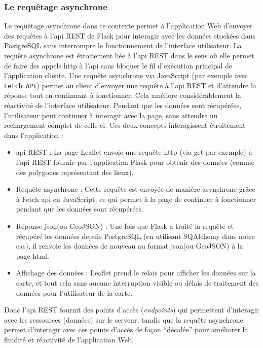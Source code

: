 \subsubsection{Le requêtage asynchrone}
Le requêtage asynchrone dans ce contexte permet à l'application Web d'envoyer des requêtes à l'\acrshort{api} REST de Flask pour interagir avec les données stockées dans PostgreSQL sans interrompre le fonctionnement de l'interface utilisateur. La requête asynchrone est étroitement liée à l'\acrshort{api} REST dans le sens où elle permet de faire des appels \acrshort{http} à l'\acrshort{api} sans bloquer le fil d'exécution principal de l'application cliente. Une requête asynchrone via JavaScript (par exemple avec \texttt{Fetch API}) permet au client d'envoyer une requête à l'\acrshort{api} REST et d’attendre la réponse tout en continuant à fonctionner. Cela améliore considérablement la réactivité de l'interface utilisateur. Pendant que les données sont récupérées, l'utilisateur peut continuer à interagir avec la page, sans attendre un rechargement complet de celle-ci. Ces deux concepts  interagissent étroitement dans l'application : 
\begin{itemize}
    \item \acrshort{api} REST : La page Leaflet envoie une requête \acrshort{http} (via \acrshort{get} par exemple) à l'\acrshort{api} REST fournie par l'application Flask pour obtenir des données (comme des polygones représentant des lieux).
    \item Requête asynchrone : Cette requête est envoyée de manière asynchrone grâce à Fetch \acrshort{api} en JavaScript, ce qui permet à la page de continuer à fonctionner pendant que les données sont récupérées. 
    \item Réponse \acrshort{json}(ou GeoJSON) : Une fois que Flask a traité la requête et récupéré les données depuis PostgreSQL (en utilisant SQAlchemy dans notre cas), il renvoie les données de nouveau au format \acrshort{json}(ou GeoJSON) à la page \acrshort{html}. 
    \item Affichage des données : Leaflet prend le relais pour afficher les données sur la carte, et tout cela sans aucune interruption visible ou délais de traitement des données pour l'utilisateur de la carte. 
\end{itemize}
Donc l'\acrshort{api} REST fournit des points d'accès (\textit{endpoints}) qui permettent d'interagir avec les ressources (données) sur le serveur, tandis que la requête asynchrone permet d'interagir avec ces points d'accès de façon \enquote{décalée} pour améliorer la fluidité et réactivité de l'application Web. 

